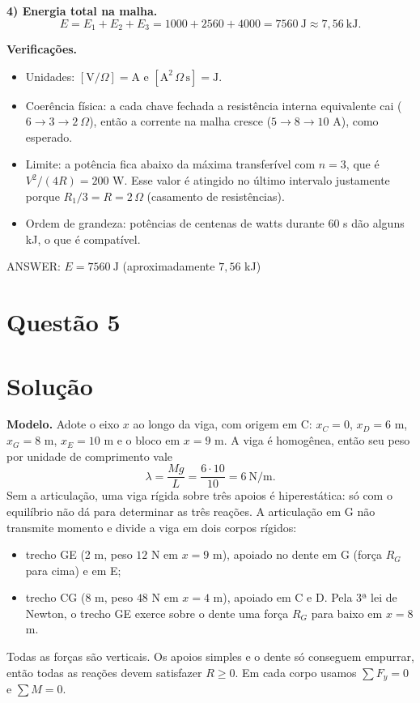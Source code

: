 \documentclass{article}%
\begin{document}
\textbf{4) Energia total na malha.}
\[
E = E_1 + E_2 + E_3 = 1000 + 2560 + 4000 = 7560\ \text{J} \approx 7{,}56\ \text{kJ}.
\]

\textbf{Verificações.}
\begin{itemize}
\item Unidades: $[\text{V}/\Omega] = \text{A}$ e $[\text{A}^2\,\Omega\,\text{s}] = \text{J}$.
\item Coerência física: a cada chave fechada a resistência interna equivalente cai ($6 \to 3 \to 2\ \Omega$), então a corrente na malha cresce ($5 \to 8 \to 10$ A), como esperado.
\item Limite: a potência fica abaixo da máxima transferível com $n=3$, que é $V^2/(4R) = 200$ W. Esse valor é atingido no último intervalo justamente porque $R_1/3 = R = 2\,\Omega$ (casamento de resistências).
\item Ordem de grandeza: potências de centenas de watts durante 60 s dão alguns kJ, o que é compatível.
\end{itemize}

ANSWER: $E = 7560\ \text{J}$ (aproximadamente $7{,}56$ kJ)%
\newpage%
\section*{Questão 5}

\section*{Solução}

\textbf{Modelo.} Adote o eixo $x$ ao longo da viga, com origem em C: $x_C=0$, $x_D=6$ m, $x_G=8$ m, $x_E=10$ m e o bloco em $x=9$ m. A viga é homogênea, então seu peso por unidade de comprimento vale
\[
\lambda=\frac{Mg}{L}=\frac{6\cdot 10}{10}=6\ \text{N/m}.
\]
Sem a articulação, uma viga rígida sobre três apoios é hiperestática: só com o equilíbrio não dá para determinar as três reações. A articulação em G não transmite momento e divide a viga em dois corpos rígidos:
\begin{itemize}
\item trecho GE (2 m, peso $12$ N em $x=9$ m), apoiado no dente em G (força $R_G$ para cima) e em E;
\item trecho CG (8 m, peso $48$ N em $x=4$ m), apoiado em C e D. Pela 3ª lei de Newton, o trecho GE exerce sobre o dente uma força $R_G$ para baixo em $x=8$ m.
\end{itemize}
Todas as forças são verticais. Os apoios simples e o dente só conseguem empurrar, então todas as reações devem satisfazer $R\ge 0$. Em cada corpo usamos $\sum F_y=0$ e $\sum M=0$.
\end{document}
